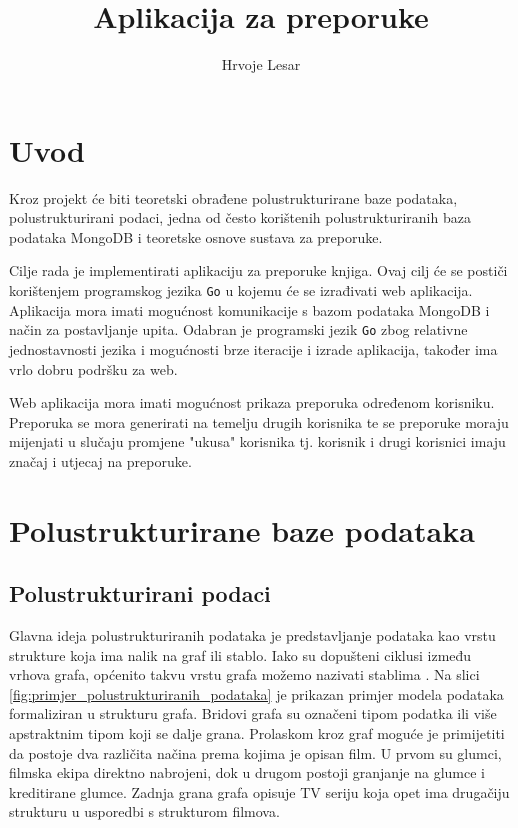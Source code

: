 \documentclass[]{foi}
\title{Aplikacija za preporuke}
\author{Hrvoje Lesar}
\begin{document}
\maketitle

\tableofcontents

\makeatletter {} \makeatother
\pagestyle{plain}

\chapter{Uvod}

Kroz projekt će biti teoretski obrađene polustrukturirane baze podataka, polustrukturirani podaci, jedna od 
često korištenih polustrukturiranih baza podataka MongoDB i teoretske osnove sustava za preporuke.

Cilje rada je implementirati aplikaciju za preporuke knjiga. Ovaj cilj će se postiči korištenjem programskog
jezika \texttt{Go} u kojemu će se izrađivati web aplikacija. Aplikacija mora imati mogućnost komunikacije
s bazom podataka MongoDB i način za postavljanje upita. Odabran je programski jezik \texttt{Go} zbog relativne
jednostavnosti jezika i mogućnosti brze iteracije i izrade aplikacija, također ima vrlo dobru podršku za web.

Web aplikacija mora imati mogućnost prikaza preporuka određenom korisniku. Preporuka se mora generirati na temelju
drugih korisnika te se preporuke moraju mijenjati u slučaju promjene "ukusa" korisnika tj. korisnik i drugi
korisnici imaju značaj i utjecaj na preporuke.

\chapter{Polustrukturirane baze podataka}

\section{Polustrukturirani podaci}

Glavna ideja polustrukturiranih podataka je predstavljanje podataka kao vrstu strukture koja ima nalik na graf ili stablo.
Iako su dopušteni ciklusi između vrhova grafa, općenito takvu vrstu grafa možemo nazivati stablima \cite{buneman1997semistructured}.
Na slici \ref{fig:primjer_polustrukturiranih_podataka} je prikazan primjer modela podataka formaliziran u strukturu grafa.
Bridovi grafa su označeni tipom podatka ili više apstraktnim tipom koji se dalje grana. Prolaskom kroz graf moguće je
primijetiti da postoje dva različita načina prema kojima je opisan film. U prvom su glumci, filmska ekipa direktno nabrojeni,
dok u drugom postoji granjanje na glumce i kreditirane glumce. Zadnja grana grafa opisuje TV seriju koja opet ima drugačiju
strukturu u usporedbi s strukturom filmova.
\end{document}
